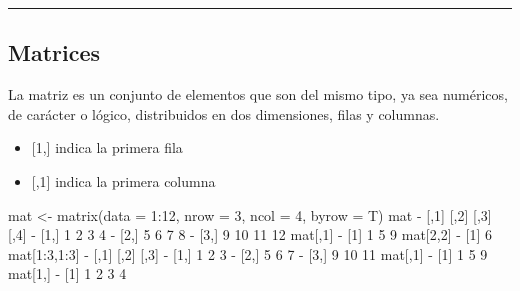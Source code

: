 \documentclass[
]{book}
\newenvironment{Shaded}{\begin{snugshade}}{\end{snugshade}}
\newcommand{\AttributeTok}[1]{\textcolor[rgb]{0.77,0.63,0.00}{#1}}
\newcommand{\DecValTok}[1]{\textcolor[rgb]{0.00,0.00,0.81}{#1}}
\newcommand{\FunctionTok}[1]{\textcolor[rgb]{0.00,0.00,0.00}{#1}}
\newcommand{\NormalTok}[1]{#1}
\newcommand{\OtherTok}[1]{\textcolor[rgb]{0.56,0.35,0.01}{#1}}
\newcommand{\SpecialCharTok}[1]{\textcolor[rgb]{0.00,0.00,0.00}{#1}}
\providecommand{\tightlist}{%
  \setlength{\itemsep}{0pt}\setlength{\parskip}{0pt}}
\begin{document}
\begin{center}\rule{0.5\linewidth}{0.5pt}\end{center}

\hypertarget{matrices}{%
\subsection{Matrices}\label{matrices}}

La matriz es un conjunto de elementos que son del mismo tipo, ya sea numéricos, de carácter o lógico, distribuidos en dos dimensiones, filas y columnas.

\begin{itemize}
\tightlist
\item
  {[}1,{]} indica la primera fila
\item
  {[},1{]} indica la primera columna
\end{itemize}

\begin{Shaded}
\begin{Highlighting}[]
\NormalTok{mat }\OtherTok{\textless{}{-}} \FunctionTok{matrix}\NormalTok{(}\AttributeTok{data =} \DecValTok{1}\SpecialCharTok{:}\DecValTok{12}\NormalTok{, }\AttributeTok{nrow =} \DecValTok{3}\NormalTok{, }\AttributeTok{ncol =} \DecValTok{4}\NormalTok{, }\AttributeTok{byrow =}\NormalTok{ T)}
\NormalTok{mat}
\SpecialCharTok{{-}}\NormalTok{      [,}\DecValTok{1}\NormalTok{] [,}\DecValTok{2}\NormalTok{] [,}\DecValTok{3}\NormalTok{] [,}\DecValTok{4}\NormalTok{]}
\SpecialCharTok{{-}}\NormalTok{ [}\DecValTok{1}\NormalTok{,]    }\DecValTok{1}    \DecValTok{2}    \DecValTok{3}    \DecValTok{4}
\SpecialCharTok{{-}}\NormalTok{ [}\DecValTok{2}\NormalTok{,]    }\DecValTok{5}    \DecValTok{6}    \DecValTok{7}    \DecValTok{8}
\SpecialCharTok{{-}}\NormalTok{ [}\DecValTok{3}\NormalTok{,]    }\DecValTok{9}   \DecValTok{10}   \DecValTok{11}   \DecValTok{12}
\NormalTok{mat[,}\DecValTok{1}\NormalTok{]}
\SpecialCharTok{{-}}\NormalTok{ [}\DecValTok{1}\NormalTok{] }\DecValTok{1} \DecValTok{5} \DecValTok{9}
\NormalTok{mat[}\DecValTok{2}\NormalTok{,}\DecValTok{2}\NormalTok{]}
\SpecialCharTok{{-}}\NormalTok{ [}\DecValTok{1}\NormalTok{] }\DecValTok{6}
\NormalTok{mat[}\DecValTok{1}\SpecialCharTok{:}\DecValTok{3}\NormalTok{,}\DecValTok{1}\SpecialCharTok{:}\DecValTok{3}\NormalTok{]}
\SpecialCharTok{{-}}\NormalTok{      [,}\DecValTok{1}\NormalTok{] [,}\DecValTok{2}\NormalTok{] [,}\DecValTok{3}\NormalTok{]}
\SpecialCharTok{{-}}\NormalTok{ [}\DecValTok{1}\NormalTok{,]    }\DecValTok{1}    \DecValTok{2}    \DecValTok{3}
\SpecialCharTok{{-}}\NormalTok{ [}\DecValTok{2}\NormalTok{,]    }\DecValTok{5}    \DecValTok{6}    \DecValTok{7}
\SpecialCharTok{{-}}\NormalTok{ [}\DecValTok{3}\NormalTok{,]    }\DecValTok{9}   \DecValTok{10}   \DecValTok{11}
\NormalTok{mat[,}\DecValTok{1}\NormalTok{]}
\SpecialCharTok{{-}}\NormalTok{ [}\DecValTok{1}\NormalTok{] }\DecValTok{1} \DecValTok{5} \DecValTok{9}
\NormalTok{mat[}\DecValTok{1}\NormalTok{,]}
\SpecialCharTok{{-}}\NormalTok{ [}\DecValTok{1}\NormalTok{] }\DecValTok{1} \DecValTok{2} \DecValTok{3} \DecValTok{4}
\end{Highlighting}
\end{Shaded}
\end{document}
